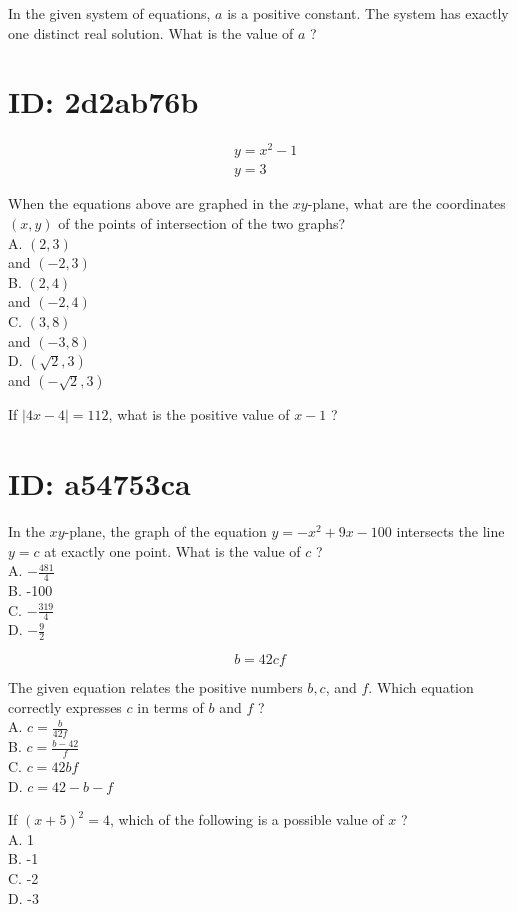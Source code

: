 In the given system of equations, $a$ is a positive constant. The system has exactly one distinct real solution. What is the value of $a$ ?

\section*{ID: 2d2ab76b}
$$
\begin{aligned}
& y=x^{2}-1 \\
& y=3
\end{aligned}
$$

When the equations above are graphed in the $x y$-plane, what are the coordinates $(x, y)$ of the points of intersection of the two graphs?\\
A. $(2,3)$\\
and $(-2,3)$\\
B. $(2,4)$\\
and $(-2,4)$\\
C. $(3,8)$\\
and $(-3,8)$\\
D. $(\sqrt{2}, 3)$\\
and $(-\sqrt{2}, 3)$

If $|4 x-4|=112$, what is the positive value of $x-1$ ?

\section*{ID: a54753ca}
In the $x y$-plane, the graph of the equation $y=-x^{2}+9 x-100$ intersects the line $y=c$ at exactly one point. What is the value of $c$ ?\\
A. $-\frac{481}{4}$\\
B. -100\\
C. $-\frac{319}{4}$\\
D. $-\frac{9}{2}$

$$
b=42 c f
$$

The given equation relates the positive numbers $b, c$, and $f$. Which equation correctly expresses $c$ in terms of $b$ and $f$ ?\\
A. $c=\frac{b}{42 f}$\\
B. $c=\frac{b-42}{f}$\\
C. $c=42 b f$\\
D. $c=42-b-f$

If $(x+5)^{2}=4$, which of the following is a possible value of $x$ ?\\
A. 1\\
B. -1\\
C. -2\\
D. -3

